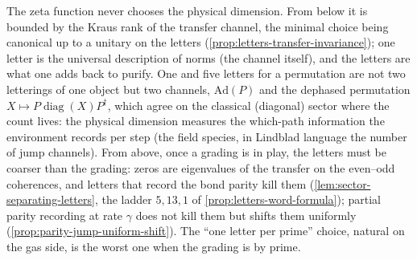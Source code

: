 \begin{observation}
\label{obs:physical-dimension-principle}
The zeta function never chooses the physical dimension. From below it is bounded by the Kraus rank
of the transfer channel, the minimal choice being canonical up to a unitary on the letters
(\cref{prop:letters-transfer-invariance}); one letter is the universal description of norms (the
channel itself), and the letters are what one adds back to purify. One and five letters for a
permutation are not two letterings of one object but two channels, $\mathrm{Ad}(P)$ and the
dephased permutation $X\mapsto P\operatorname{diag}(X)P^\dagger$, which agree on the classical
(diagonal) sector where the count lives: the physical dimension measures the which-path information
the environment records per step (the field species, in Lindblad language the number of jump
channels). From above, once a grading is in play, the letters must be coarser than the grading:
zeros are eigenvalues of the transfer on the even--odd coherences, and letters that record the bond
parity kill them (\cref{lem:sector-separating-letters}, the ladder $5,13,1$ of
\cref{prop:letters-word-formula}); partial parity recording at rate $\gamma$ does not kill them but
shifts them uniformly (\cref{prop:parity-jump-uniform-shift}). The ``one letter per prime'' choice,
natural on the gas side, is the worst one when the grading is by prime.
\end{observation}

